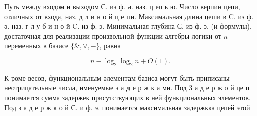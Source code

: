\documentclass[10pt]{article}
\begin{document}
Путь между входом и выходом С. из ф. ә. наз. ц еп ь ю. Число верпин цепи, отличных от входа, наз. д л и н о й ц е пи. Максимальная длина цеши в $\mathrm{C}$. из ф. ә. наз. г л у б и н о й $\mathrm{C}$. из ф. э. Минимальная глубина С. из ф. э. (и формулы), достаточная для реализации произвольной функции алгебры логики от $n$ переменных в базисе $\{\&, \vee,-\}$, равна



\[

n-\log _{2} \log _{2} n+O(1) .

\]



К роме весов, функциональным әлементам базиса могут быть приписаны неотрицательные числа, именуемые з а д е р ж к а ми. Под 3 а д е р ж о й це п понимается сумма задержек присутствующих в ней функциональных элементов. Под з а д е р ж к о й С. и ф. э. понимается максимальная задержкка цепей этой
\end{document}
